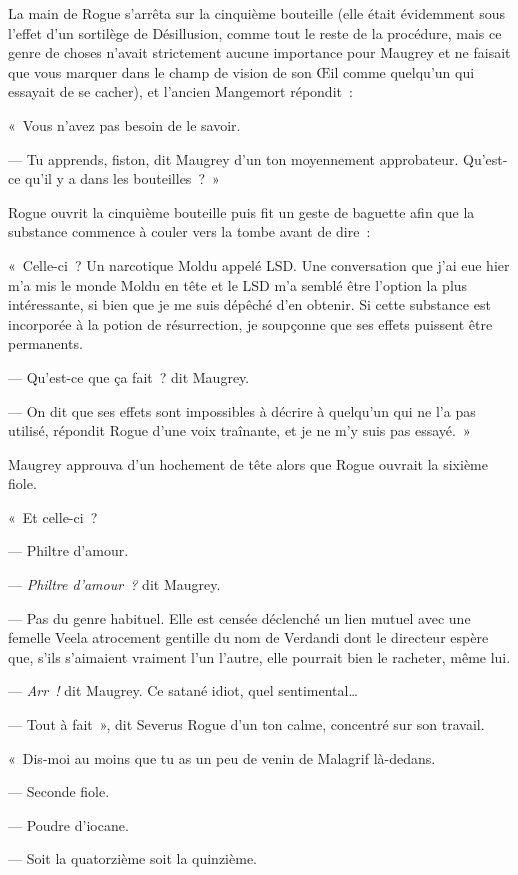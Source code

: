La main de Rogue s'arrêta sur la cinquième bouteille (elle était évidemment sous l'effet d'un sortilège de Désillusion, comme tout le reste de la procédure, mais ce genre de choses n'avait strictement aucune importance pour Maugrey et ne faisait que vous marquer dans le champ de vision de son Œil comme quelqu'un qui essayait de se cacher), et l'ancien Mangemort répondit~:

«~Vous n'avez pas besoin de le savoir.

--- Tu apprends, fiston, dit Maugrey d'un ton moyennement approbateur.
Qu'est-ce qu'il y a dans les bouteilles~?~»

Rogue ouvrit la cinquième bouteille puis fit un geste de baguette afin que la substance commence à couler vers la tombe avant de dire~:

«~Celle-ci~?
Un narcotique Moldu appelé LSD.
Une conversation que j'ai eue hier m'a mis le monde Moldu en tête et le LSD m'a semblé être l'option la plus intéressante, si bien que je me suis dépêché d'en obtenir.
Si cette substance est incorporée à la potion de résurrection, je soupçonne que ses effets puissent être permanents.

--- Qu'est-ce que ça fait~? dit Maugrey.

--- On dit que ses effets sont impossibles à décrire à quelqu'un qui ne l'a pas utilisé, répondit Rogue d'une voix traînante, et je ne m'y suis pas essayé.~»

Maugrey approuva d'un hochement de tête alors que Rogue ouvrait la sixième fiole.

«~Et celle-ci~?

--- Philtre d'amour.

--- \emph{Philtre d'amour~?} dit Maugrey.

--- Pas du genre habituel.
Elle est censée déclenché un lien mutuel avec une femelle Veela atrocement gentille du nom de Verdandi dont le directeur espère que, s'ils s'aimaient vraiment l'un l'autre, elle pourrait bien le racheter, même lui.

--- \emph{Arr~!}  dit Maugrey.
Ce satané idiot, quel sentimental…

--- Tout à fait~», dit Severus Rogue d'un ton calme, concentré sur son travail.

«~Dis-moi au moins que tu as un peu de venin de Malagrif là-dedans.

--- Seconde fiole.

--- Poudre d'iocane.

--- Soit la quatorzième soit la quinzième.

